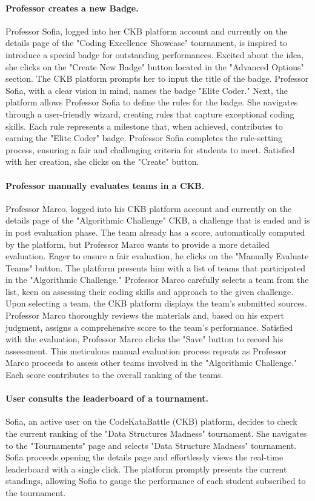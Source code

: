 \paragraph*{Professor creates a new Badge.}
Professor Sofia, logged into her CKB platform account and currently on the details page of the "Coding Excellence Showcase" tournament, is inspired to introduce a special badge for outstanding performances. 
Excited about the idea, she clicks on the "Create New Badge" button located in the "Advanced Options" section.
The CKB platform prompts her to input the title of the badge. 
Professor Sofia, with a clear vision in mind, names the badge "Elite Coder."
Next, the platform allows Professor Sofia to define the rules for the badge. 
She navigates through a user-friendly wizard, creating rules that capture exceptional coding skills. 
Each rule represents a milestone that, when achieved, contributes to earning the "Elite Coder" badge.
Professor Sofia completes the rule-setting process, ensuring a fair and challenging criteria for students to meet. 
Satisfied with her creation, she clicks on the "Create" button.

\paragraph*{Professor manually evaluates teams in a CKB.}
Professor Marco, logged into his CKB platform account and currently on the details page of the "Algorithmic Challenge" CKB, a challenge that is ended and is in post evaluation phase.
The team already has a score, automatically computed by the platform, but Professor Marco wants to provide a more detailed evaluation. 
Eager to ensure a fair evaluation, he clicks on the "Manually Evaluate Teams" button.
The platform presents him with a list of teams that participated in the "Algorithmic Challenge." 
Professor Marco carefully selects a team from the list, keen on assessing their coding skills and approach to the given challenge.
Upon selecting a team, the CKB platform displays the team's submitted sources. 
Professor Marco thoroughly reviews the materials and, based on his expert judgment, assigns a comprehensive score to the team's performance.
Satisfied with the evaluation, Professor Marco clicks the "Save" button to record his assessment. 
This meticulous manual evaluation process repeats as Professor Marco proceeds to assess other teams involved in the "Algorithmic Challenge." 
Each score contributes to the overall ranking of the teams.

\paragraph*{User consults the leaderboard of a tournament.}
Sofia, an active user on the CodeKataBattle (CKB) platform, decides to check the current ranking of the "Data Structures Madness" tournament. 
She navigates to the "Tournaments" page and selects "Data Structure Madness" tournament.
Sofia proceeds opening the details page and effortlessly views the real-time leaderboard with a single click. 
The platform promptly presents the current standings, allowing Sofia to gauge the performance of each student subscribed to the tournament.

